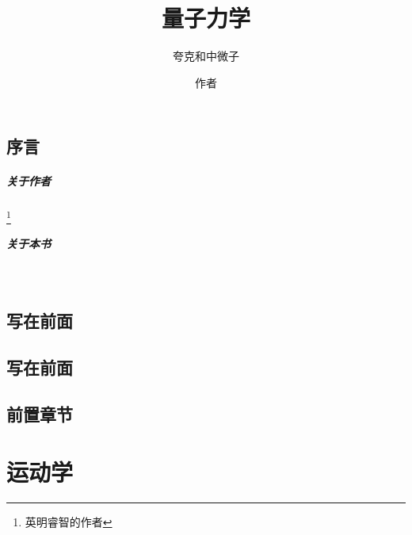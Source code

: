 \documentclass[color=BLUE]{textbook-cn}%
\title{量子力学}
\subtitle{夸克和中微子}
\author{作者}
\begin{document}
\makecover


\maketitle


\frontmatter



\chapter*{序言}
\subsubsection{关于作者}\footnote{英明睿智的作者}
\lipsum
\subsubsection{关于本书}


\begin{center}
\scalebox{8}{\TextBook}\\[7.5pt]
\scalebox{8}{\TextBook*}
\end{center}

\chapter*{写在前面}
\lipsum


\chapter{写在前面}
\lipsum




\printnomenclature


\tableofcontents*

\listoffigures*


\listoftables*

\mainmatter
\tcbstartrecording






\chapter{前置章节}
\lipsum\lipsum\lipsum


\part{运动学}
\end{document}
